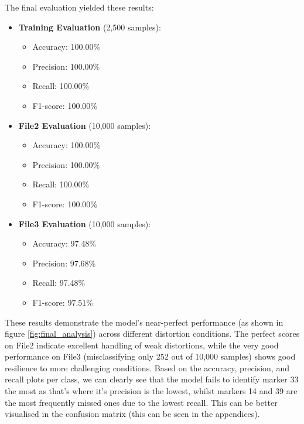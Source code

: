 \documentclass[conference]{IEEEtran}
\begin{document}
The final evaluation yielded these results:

\begin{itemize}
    \item \textbf{Training Evaluation} (2,500 samples):
        \begin{itemize}
            \item Accuracy: 100.00\%
            \item Precision: 100.00\%
            \item Recall: 100.00\%
            \item F1-score: 100.00\%
        \end{itemize}
    \item \textbf{File2 Evaluation} (10,000 samples):
        \begin{itemize}
            \item Accuracy: 100.00\%
            \item Precision: 100.00\%
            \item Recall: 100.00\%
            \item F1-score: 100.00\%
        \end{itemize}
    \item \textbf{File3 Evaluation} (10,000 samples):
        \begin{itemize}
            \item Accuracy: 97.48\%
            \item Precision: 97.68\%
            \item Recall: 97.48\%
            \item F1-score: 97.51\%
        \end{itemize}
\end{itemize}

These results demonstrate the model's near-perfect performance (as shown in figure \ref{fig:final_analysis}) across different distortion conditions.
The perfect scores on File2 indicate excellent handling of weak distortions, while the very good performance on File3
(misclassifying only 252 out of 10,000 samples) shows good resilience to more challenging conditions. Based on the accuracy, precision, and recall
plots per class, we can clearly see that the model fails to identify marker 33 the most as that's where it's precision is the lowest,
whilst markers 14 and 39 are the most frequently missed ones due to the lowest recall. This can be better visualised in the confusion matrix (this can be seen in
the appendices).
\end{document}
